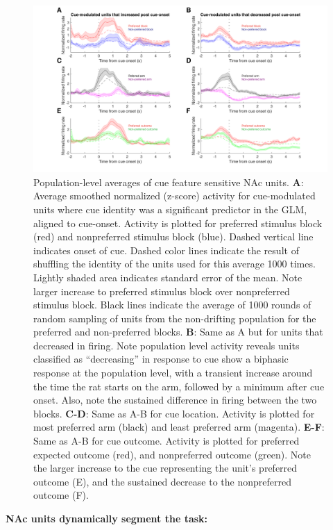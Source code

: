\documentclass[11pt]{article}
\newcommand{\bsf}[1]{\textbf{#1}}
\begin{document}
 \begin{figure}[ht!]
\centering
\includegraphics[width=\textwidth]{Fig 7 - Population averages.pdf}
\caption{Population-level averages of cue feature sensitive NAc units. \bsf{A}:
  Average smoothed normalized (z-score) activity for cue-modulated units where
  cue identity was a significant predictor in the GLM, aligned to
  cue-onset. Activity is plotted for preferred stimulus block (red) and
  nonpreferred stimulus block (blue). Dashed vertical line indicates onset of
  cue. Dashed color lines indicate the result of shuffling the identity of the units used for this average 1000 times. Lightly shaded area indicates standard error of the mean. Note larger
  increase to preferred stimulus block over nonpreferred stimulus block. Black
  lines indicate the average of 1000 rounds of random sampling of units from the
  non-drifting population for the preferred and non-preferred blocks. \bsf{B}:
  Same as A but for units that decreased in firing. Note population level
  activity reveals units classified as “decreasing” in response to cue show a
  biphasic response at the population level, with a transient increase around
  the time the rat starts on the arm, followed by a minimum after cue
  onset. Also, note the sustained difference in firing between the two
  blocks. \bsf{C-D}: Same as A-B for cue location. Activity is plotted for
  most preferred arm (black) and least preferred arm (magenta). \bsf{E-F}: Same as A-B for cue outcome. Activity is
  plotted for preferred expected outcome (red), and nonpreferred outcome
  (green). Note the larger increase to the cue representing the unit’s preferred
  outcome (E), and the sustained decrease to the nonpreferred outcome (F).}
\label{fig:pop}
\end{figure} \clearpage

{\bf NAc units dynamically segment the task:}
\end{document}
